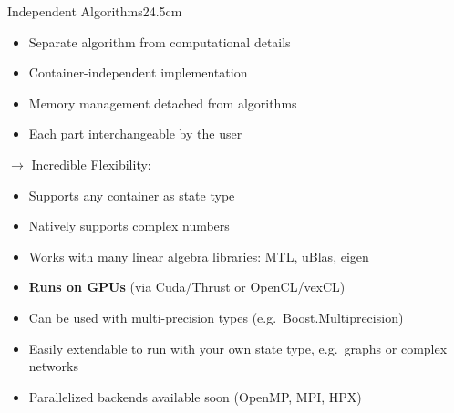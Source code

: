 \documentclass[final,hyperref={pdfpagelabels=false}]{beamer}
\begin{document}
\begin{frame}[fragile]{}
\begin{columns}[t]
  \begin{column}{0.495\linewidth}
    \begin{blockwh}{Independent Algorithms}{24.5cm}
      \begin{itemize}
       \item Separate algorithm from computational details
       \item Container-independent implementation
       \item Memory management detached from algorithms
       \item Each part interchangeable by the user
      \end{itemize}
      \vspace{1em}
      {\large$\longrightarrow$ Incredible Flexibility:}
      \vspace{.5em}
      \begin{itemize}
       \item Supports any container as state type
       \item Natively supports complex numbers
       \item Works with many linear algebra libraries: MTL, uBlas, eigen
       \item \textbf{Runs on GPUs} (via Cuda/Thrust or OpenCL/vexCL)
       \item Can be used with multi-precision types (e.g.\ Boost.Multiprecision)
       \item Easily extendable to run with your own state type, e.g.\ graphs or complex networks
       \item Parallelized backends available soon (OpenMP, MPI, HPX)
      \end{itemize}

    \end{blockwh}
  \end{column}

\end{columns}

\begin{columns}[t]


\end{columns}
\end{frame}
\end{document}
